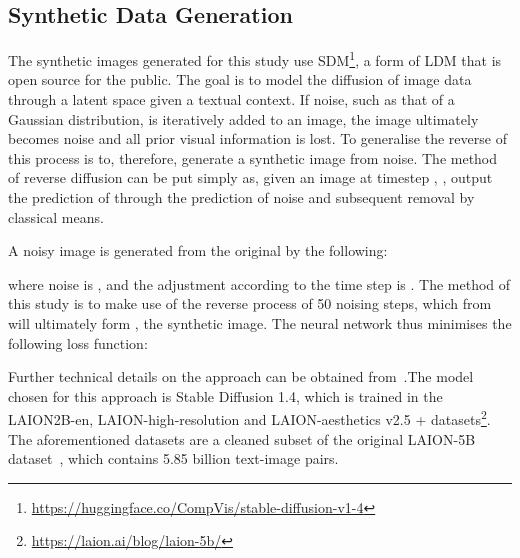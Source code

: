 \documentclass{article}
\begin{document}
\subsection{Synthetic Data Generation}
\label{subsec:synth}
The synthetic images generated for this study use SDM\footnote{\url{https://huggingface.co/CompVis/stable-diffusion-v1-4}}, a form of LDM that is open source for the public. The goal is to model the diffusion of image data through a latent space given a textual context. If noise, such as that of a Gaussian distribution, is iteratively added to an image, the image ultimately becomes noise and all prior visual information is lost. To generalise the reverse of this process is to, therefore, generate a synthetic image from noise. The method of reverse diffusion can be put simply as, given an image  at timestep , , output the prediction of  through the prediction of noise and subsequent removal by classical means. 

A noisy image  is generated from the original  by the following:



\noindent where noise is , and the adjustment according to the time step  is . 
The method of this study is to make use of the reverse process of 50 noising steps, which from  will ultimately form , the synthetic image. The neural network  thus minimises the following loss function:



Further technical details on the approach can be obtained from~\cite{rombach2022high}.The model chosen for this approach is Stable Diffusion 1.4, which is trained in the LAION2B-en, LAION-high-resolution and LAION-aesthetics v2.5 + datasets\footnote{\url{https://laion.ai/blog/laion-5b/}}. The aforementioned datasets are a cleaned subset of the original LAION-5B dataset~\cite{schuhmann2022laion}, which contains 5.85 billion text-image pairs. 
\end{document}
